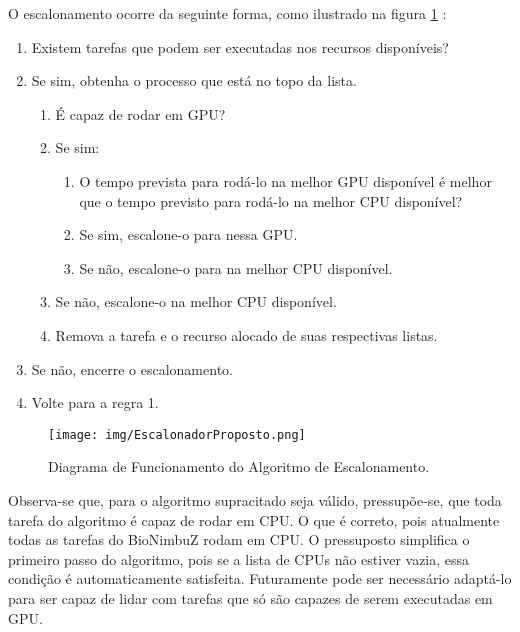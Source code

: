 O escalonamento ocorre da seguinte forma, como ilustrado na figura \ref{Escalonamento} :
\begin{enumerate}
	\item Existem tarefas que podem ser executadas nos recursos disponíveis?
	\item Se sim, obtenha o processo que está no topo da lista.
	\begin{enumerate}
		\item É capaz de rodar em GPU?
		\item Se sim:
		\begin{enumerate}
			\item O tempo prevista para rodá-lo na melhor \acrshort{GPU} disponível é melhor que o tempo previsto para rodá-lo na melhor \acrshort{CPU} disponível?
			\item Se sim, escalone-o para nessa \acrshort{GPU}.
			\item Se não, escalone-o para na melhor \acrshort{CPU} disponível.
		\end{enumerate}
		\item Se não, escalone-o na melhor \acrshort{CPU} disponível.
		\item Remova a tarefa e o recurso alocado de suas respectivas listas.
	\end{enumerate}
	\item Se não, encerre o escalonamento.
	\item Volte para a regra 1.
\end{enumerate}


\begin{figure}[htbp]
	\centerline{\texttt{[image: img/EscalonadorProposto.png]}}
	\caption{Diagrama de Funcionamento do Algoritmo de Escalonamento.}
	\label{Escalonamento}
\end{figure}

Observa-se que, para o algoritmo supracitado seja válido, pressupõe-se, que toda tarefa do algoritmo é capaz de rodar em CPU. O que é correto, pois atualmente todas as tarefas do BioNimbuZ rodam em \acrshort{CPU}. O pressuposto simplifica o primeiro passo do algoritmo, pois se a lista de \acrshort{CPU}s não estiver vazia, essa condição é automaticamente satisfeita. Futuramente pode ser necessário adaptá-lo para ser capaz de lidar com tarefas que só são capazes de serem executadas em \acrshort{GPU}.
